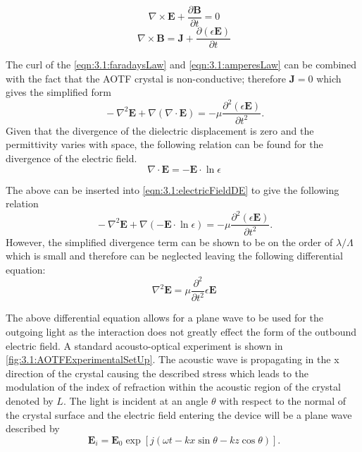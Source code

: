 \begin{equation}
    \ \nabla \times \mathbf{E} + \frac{\partial \mathbf{B}}{\partial t} = 0
    \label{eqn:3.1:faradaysLaw}
\end{equation}
\begin{equation}
    \ \nabla \times \mathbf{B} = \mathbf{J} + \frac{\partial(\epsilon \mathbf{E})}{\partial t}
    \label{eqn:3.1:amperesLaw}
\end{equation}

The curl of the \autoref{eqn:3.1:faradaysLaw} and \autoref{eqn:3.1:amperesLaw} can be combined with the fact that the AOTF crystal is non-conductive; therefore $\mathbf{J} = 0$ which gives the simplified form
\begin{equation}
    \ -\nabla^{2} \mathbf{E} + \nabla (\nabla \cdot \mathbf{E}) = -\mu \frac{\partial^{2} (\epsilon \mathbf{E})}{\partial t^{2}}.
    \label{eqn:3.1:electricFieldDE}
\end{equation}
Given that the divergence of the dielectric displacement is zero and the permittivity varies with space, the following relation can be found for the divergence of the electric field.
\begin{equation}
    \ \nabla \cdot \mathbf{E} = -\mathbf{E} \cdot \ln{\epsilon}
    \label{eqn:3.1:divergenceEField}
\end{equation}

The above can be inserted into \autoref{eqn:3.1:electricFieldDE} to give the following relation
\begin{equation}
    \ -\nabla^{2} \mathbf{E} + \nabla (-\mathbf{E} \cdot \ln{\epsilon}) = -\mu \frac{\partial^{2} (\epsilon \mathbf{E})}{\partial t^{2}}.
    \label{eqn:3.1:electricFieldDEAcousticWave}
\end{equation}
However, the simplified divergence term can be shown to be on the order of $\lambda /\Lambda$ which is small and therefore can be neglected leaving the following differential equation:
\begin{equation}
    \ \nabla^{2} \mathbf{E} = \mu \frac{\partial^{2}}{\partial t^{2}}\epsilon \mathbf{E}
    \label{eqn:3.1:eletricFieldAcoustoWave}
\end{equation}

The above differential equation allows for a plane wave to be used for the outgoing light as the interaction does not greatly effect the form of the outbound electric field. A standard acousto-optical experiment is shown in \autoref{fig:3.1:AOTFExperimentalSetUp}. The acoustic wave is propagating in the x direction of the crystal causing the described stress which leads to the modulation of the index of refraction within the acoustic region of the crystal denoted by $L$. The light is incident at an angle $\theta$ with respect to the normal of the crystal surface and the electric field entering the device will be a plane wave described by
\begin{equation}
    \ \mathbf{E}_{i} = \mathbf{E}_{0}\exp[j(\omega t-kx\sin \theta - kz \cos \theta)].
    \label{eqn:3.1:planeWaveEField}
\end{equation}

